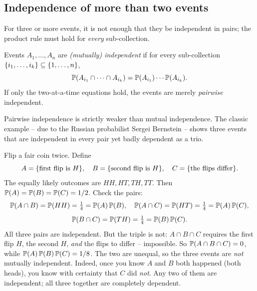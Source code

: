 \subsection{Independence of more than two events}

For three or more events, it is not enough that they be independent in pairs; the product rule must hold for \emph{every} sub-collection.

\begin{definition}
\label{ch04:def-mutual-indep}
Events $A_1, \dots, A_n$ are \emph{(mutually) independent} if for every sub-collection $\set{i_1, \dots, i_k} \subseteq \set{1,\dots,n}$,
\[
\P(A_{i_1} \cap \cdots \cap A_{i_k}) = \P(A_{i_1})\cdots\P(A_{i_k}).
\]
If only the two-at-a-time equations hold, the events are merely \emph{pairwise} independent.
\end{definition}

Pairwise independence is strictly weaker than mutual independence. The classic example -- due to the Russian probabilist Sergei Bernstein -- shows three events that are independent in every pair yet badly dependent as a trio.

\begin{example}
\label{ch04:ex-bernstein}
Flip a fair coin twice. Define
\[
A = \set{\text{first flip is }H}, \quad B = \set{\text{second flip is }H}, \quad C = \set{\text{the flips differ}}.
\]
The equally likely outcomes are $HH, HT, TH, TT$. Then $\P(A)=\P(B)=\P(C)=1/2$. Check the pairs:
\[
\P(A\cap B) = \P(HH) = \tfrac14 = \P(A)\P(B), \quad
\P(A\cap C) = \P(HT) = \tfrac14 = \P(A)\P(C),
\]
\[
\P(B\cap C) = \P(TH) = \tfrac14 = \P(B)\P(C).
\]
All three pairs are independent. But the triple is not: $A\cap B\cap C$ requires the first flip $H$, the second $H$, \emph{and} the flips to differ -- impossible. So $\P(A\cap B\cap C) = 0$, while $\P(A)\P(B)\P(C) = 1/8$. The two are unequal, so the three events are \emph{not}
mutually independent. Indeed, once you know $A$ and $B$ both happened (both heads),
you know with certainty that $C$ did \emph{not}. Any two of them are independent;
all three together are completely dependent.
\end{example}

